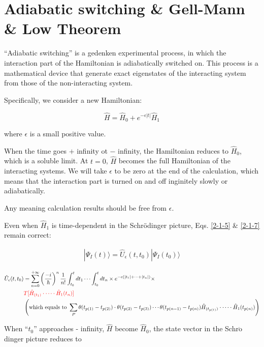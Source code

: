 \section{Adiabatic switching \& Gell-Mann \& Low Theorem}

``Adiabatic switching'' is a gedenken experimental process, in which the interaction part of the Hamiltonian is adiabatically switched on. This process is a mathematical device that generate exact eigenstates of the interacting system from those of the non-interacting system. 

Specifically, we consider a new Hamiltonian:

\[\hat{H}=\hat{H}_0+e^{-\epsilon|t|}\hat{H}_1 \]

where $\epsilon$ is a small positive value. 

When the time goes $+$ infinity ot $-$ infinity, the Hamiltonian reduces to $\hat{H}_0$, which is a soluble limit. At $t=0$, $\hat{H}$ becomes the full Hamiltonian of the interacting systems. We will take $\epsilon$ to be zero at the end of the calculation, which means that the interaction part is turned on and off inginitely slowly or adiabatically. 

Any meaning calculation results should be free from $\epsilon$. 

Even when $\hat{H}_1$ is time-dependent in the Schr\"{o}dinger picture, Eqs. \eqref{2-1-5} \& \eqref{2-1-7} remain correct:

\begin{align}
|\Psi_I(t)\rangle=\hat{U}_\epsilon(t,t_0)|\Psi_I(t_0)\rangle
\end{align}

\begin{align}\label{2-2-2}
\hat{U}_\epsilon(t,t_0)&=\sum_{n=0}^{+\infty}\left(\frac{-i}{\hbar}\right)^n\frac{1}{n!}\int_{t_0}^t dt_1 \cdots \int_{t_0}^t dt_n\times e^{-\epsilon(|t_1|+\cdots+|t_n|)}\times\\
\nonumber&{\color{red}{T[\hat{H}_{(t_1)}\cdot\cdots\cdot\hat{H}_1(t_n)]}}\\
\nonumber&\left(\text{which equals to\ }\sum_P\theta(t_{p(1)}-t_{p(2)})\cdot\theta(t_{p(2)}-t_{p(3)})\cdots\theta(t_{p(n-1)}-t_{p(n)}) \hat{H}_{(t_{p(1)})}\cdot\cdots\cdot\hat{H}_1(t_{p(n)})\right)
\end{align}



When ``$t_0$'' approaches - infinity, $\hat{H}$ become $\hat{H}_0$, the state vector in the Schr$\ddot{\text{o}}$dinger picture reduces to

